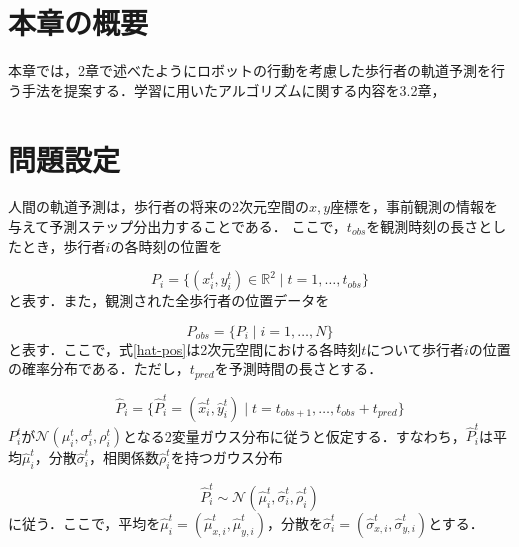 
\section{本章の概要}

本章では，2章で述べたようにロボットの行動を考慮した歩行者の軌道予測を行う手法を提案する．学習に用いたアルゴリズムに関する内容を3.2章，



\section{問題設定}


人間の軌道予測は，歩行者の将来の2次元空間の$x,y$座標を，事前観測の情報を与えて予測ステップ分出力することである．
ここで，$t_{obs}$を観測時刻の長さとしたとき，歩行者$i$の各時刻の位置を

\begin{equation}
  P_i = \{ (x^t_i, y^t_i) \in \mathbb{R}^2 \mid t = 1, \dots , t_{obs} \}
\end{equation}
と表す．また，観測された全歩行者の位置データを

\begin{equation}
  P_{obs} = \{ P_i \mid i = 1, \dots , N \}  
\end{equation}
と表す．ここで，式\eqref{hat-pos}は2次元空間における各時刻$t$について歩行者$i$の位置の確率分布である．ただし，$t_{pred}$を予測時間の長さとする．

\begin{equation}
  \hat{P}_i = \{ \hat{P}^t_i = (\hat{x}^t_i, \hat{y}^t_i) \mid t = t_{obs + 1}, \dots , t_{obs} + t_{pred} \} \label{hat-pos}
\end{equation}
$P^t_i$が$\mathcal{N}(\mu^t_i, \sigma^t_i, \rho^t_i)$となる2変量ガウス分布に従うと仮定する．すなわち，$\hat{P}^t_i$は平均$\hat{\mu}^t_i$，分散$\hat{\sigma}^t_i$，相関係数$\hat{\rho}^t_i$を持つガウス分布

\begin{equation}
  \hat{P}^t_i \sim \mathcal{N}(\hat{\mu}^t_i, \hat{\sigma}^t_i, \hat{\rho}^t_i)
\end{equation}
に従う．ここで，平均を$\hat{\mu}^t_i = (\hat{\mu}^t_{x, i}, \hat{\mu}^t_{y, i})$，分散を$\hat{\sigma}^t_i = (\hat{\sigma}^t_{x, i}, \hat{\sigma}^t_{y, i})$とする．

